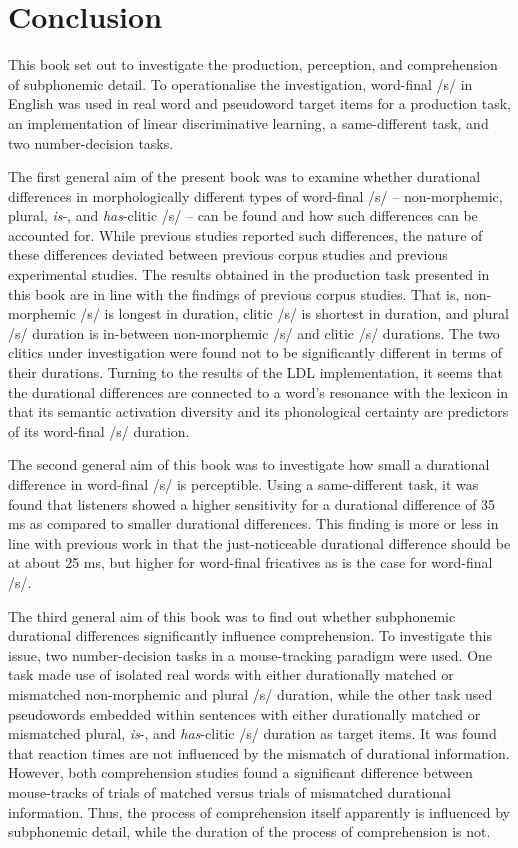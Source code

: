 \chapter{Conclusion}\label{chapter10}

This book set out to investigate the production, perception, and comprehension of subphonemic detail. To operationalise the investigation, word-final /s/ in English was used in real word and pseudoword target items for a production task, an implementation of linear discriminative learning, a same-different task, and two number-decision tasks.

The first general aim of the present book was to examine whether durational differences in morphologically different types of word-final /s/ – non-morphemic, plural, \textit{is}-, and \textit{has}-clitic /s/ – can be found and how such differences can be accounted for. While previous studies reported such differences, the nature of these differences deviated between previous corpus studies and previous experimental studies. The results obtained in the production task presented in this book are in line with the findings of previous corpus studies. That is, non-morphemic /s/ is longest in duration, clitic /s/ is shortest in duration, and plural /s/ duration is in-between non-morphemic /s/ and clitic /s/ durations. The two clitics under investigation were found not to be significantly different in terms of their durations. Turning to the results of the LDL implementation, it seems that the durational differences are connected to a word’s resonance with the lexicon in that its semantic activation diversity and its phonological certainty are predictors of its word-final /s/ duration.

The second general aim of this book was to investigate how small a durational difference in word-final /s/ is perceptible. Using a same-different task, it was found that listeners showed a higher sensitivity for a durational difference of 35 ms as compared to smaller durational differences. This finding is more or less in line with previous work in that the just-noticeable durational difference should be at about 25 ms, but higher for word-final fricatives as is the case for word-final /s/.

The third general aim of this book was to find out whether subphonemic durational differences significantly influence comprehension. To investigate this issue, two number-decision tasks in a mouse-tracking paradigm were used. One task made use of isolated real words with either durationally matched or mismatched non-morphemic and plural /s/ duration, while the other task used pseudowords embedded within sentences with either durationally matched or mismatched plural, \textit{is}-, and \textit{has}-clitic /s/ duration as target items. It was found that reaction times are not influenced by the mismatch of durational information. However, both comprehension studies found a significant difference between mouse-tracks of trials of matched versus trials of mismatched durational information. Thus, the process of comprehension itself apparently is influenced by subphonemic detail, while the duration of the process of comprehension is not.

